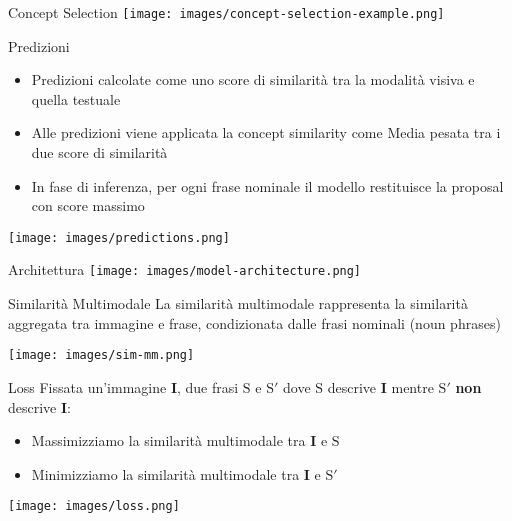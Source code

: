 \documentclass{beamer}
\begin{document}
\begin{frame}{Concept Selection}
  \centering
  \texttt{[image: images/concept-selection-example.png]}
\end{frame}

\begin{frame}{Predizioni}
  \begin{itemize}
    \item Predizioni calcolate come uno \alert{score di similarità}
    tra la modalità visiva e quella testuale
    \item Alle predizioni viene applicata la concept similarity come
    \alert{Media pesata} tra i due score di similarità
    \item In fase di inferenza, per ogni frase nominale il modello
    restituisce la \alert{proposal con score massimo}
  \end{itemize}

  \vspace{0.5cm}

  \centering
  \texttt{[image: images/predictions.png]}
\end{frame}

\begin{frame}{Architettura}
  \centering
  \texttt{[image: images/model-architecture.png]}
\end{frame}

\begin{frame}{Similarità Multimodale}
  La similarità multimodale rappresenta la \alert{similarità aggregata
  tra immagine e frase}, condizionata dalle frasi nominali (noun
  phrases) \vspace{1cm}

  \centering
  \texttt{[image: images/sim-mm.png]}
\end{frame}

\begin{frame}{Loss}
  Fissata un'immagine $\bm{I}$, due frasi $\text{S}$ e $\text{S}'$
  dove $\text{S}$ descrive $\bm{I}$ mentre $\text{S}'$ \textbf{non}
  descrive $\bm{I}$:
  \begin{itemize}
    \item \alert{Massimizziamo} la similarità multimodale tra $\bm{I}$
    e $\text{S}$
    \item \alert{Minimizziamo} la similarità multimodale tra $\bm{I}$
    e $\text{S}'$
  \end{itemize}
  
  \vspace{0.5cm}

  \centering
  \texttt{[image: images/loss.png]}
\end{frame}
\end{document}
